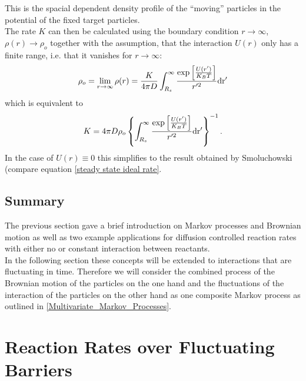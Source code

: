 This is the spacial dependent density profile of the ``moving'' particles in the potential of the fixed target particles. \\
The rate $K$ can then be calculated using the boundary condition $r \rightarrow \infty$, $\rho(r) \rightarrow \rho_o$ together with the assumption, that the interaction $U(r)$ only has a finite range, i.e. that it vanishes for $r \rightarrow \infty$:
\begin{equation}
    \rho_o = \lim_{r\rightarrow \infty} \rho(r) = \frac{K}{4 \pi D}\int_{R_s}^{\infty} \frac{\exp \left[ \frac{U(r')}{K_B T}\right]}{r'^2} \rm d r'
    \label{lim_rho_debye_infty}
\end{equation}
which is equivalent to 
\begin{equation}
    K = 4 \pi D \rho_o \left\{\int_{R_s}^{\infty} \frac{\exp \left[ \frac{U(r')}{K_B T}\right]}{r'^2} \rm d r' \right\}^{-1}.
    \label{K_Debye}
\end{equation}
In the case of $U(r) \equiv 0$ this simplifies to the result obtained by Smoluchowski (compare equation \eqref{steady state ideal rate}. \par
\subsection{Summary}
The previous section gave a brief introduction on Markov processes and Brownian motion as well as two example applications for diffusion controlled reaction rates with either no or constant interaction between reactants. \\
In the following section these concepts will be extended to interactions that are fluctuating in time. Therefore we will consider the combined process of the Brownian motion of the particles on the one hand and the fluctuations of the interaction of the particles on the other hand as one composite Markov process as outlined in \ref{Multivariate_Markov_Processes}.

\newpage
\section{Reaction Rates over Fluctuating Barriers}
\label{Reaction_Rates_over_Fluctuating_Barriers}

